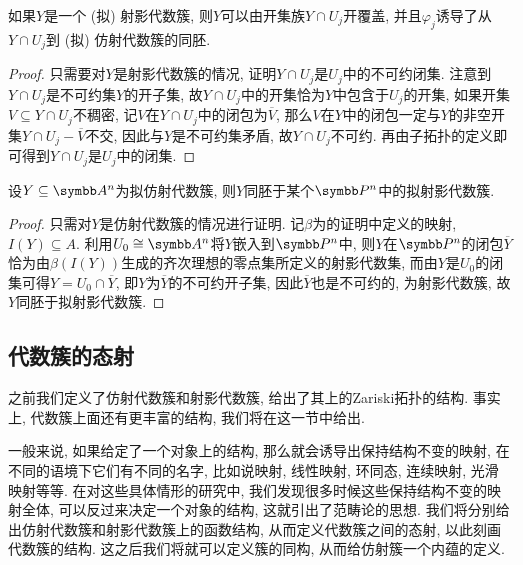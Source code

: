 \begin{proposition}\label{prop:projvarietyopencoverhomeo}
  如果$Y$是一个 (拟) 射影代数簇, 则$Y$可以由开集族$Y\cap U_j$开覆盖, 并且$\varphi_j$诱导了从$Y\cap U_j$到 (拟) 仿射代数簇的同胚.
\end{proposition}

\begin{proof}
  只需要对$Y$是射影代数簇的情况, 证明$Y\cap U_j$是$U_j$中的不可约闭集. 注意到$Y\cap U_j$是不可约集$Y$的开子集, 故$Y\cap U_j$中的开集恰为$Y$中包含于$U_j$的开集\parencite[89, Lemma 16.2]{munkres_topology_2000}, 如果开集$V\subseteq Y\cap U_j$不稠密, 记$V$在$Y\cap U_j$中的闭包为$\overline{V}$, 那么$V$在$Y$中的闭包一定与$Y$的非空开集$Y\cap U_j-\overline{V}$不交\parencite[95, Theorem 17.5]{munkres_topology_2000}, 因此与$Y$是不可约集矛盾, 故$Y\cap U_j$不可约. 再由子拓扑的定义即可得到$Y\cap U_j$是$U_j$中的闭集.
\end{proof}

\begin{proposition}
  设$Y\subseteq \AF^n$为拟仿射代数簇, 则$Y$同胚于某个$\PP^n$中的拟射影代数簇.
\end{proposition}

\begin{proof}
  只需对$Y$是仿射代数簇的情况进行证明. 记$\beta$为的证明中定义的映射, $I(Y)\subseteq A$. 利用$U_0\cong\AF^n$将$Y$嵌入到$\PP^n$中, 则$Y$在$\PP^n$的闭包$\overline{Y}$恰为由$\beta (I(Y))$生成的齐次理想的零点集所定义的射影代数集, 而由$Y$是$U_0$的闭集可得$Y=U_0\cap \overline{Y}$, 即$Y$为$\overline{Y}$的不可约开子集, 因此$\overline{Y}$也是不可约的, 为射影代数簇, 故$Y$同胚于拟射影代数簇.
\end{proof}

\subsection{代数簇的态射}

之前我们定义了仿射代数簇和射影代数簇, 给出了其上的Zariski拓扑的结构. 事实上, 代数簇上面还有更丰富的结构, 我们将在这一节中给出.

一般来说, 如果给定了一个对象上的结构, 那么就会诱导出保持结构不变的映射, 在不同的语境下它们有不同的名字, 比如说映射, 线性映射, 环同态, 连续映射, 光滑映射等等. 在对这些具体情形的研究中, 我们发现很多时候这些保持结构不变的映射全体, 可以反过来决定一个对象的结构, 这就引出了范畴论的思想. 我们将分别给出仿射代数簇和射影代数簇上的函数结构, 从而定义代数簇之间的态射, 以此刻画代数簇的结构. 这之后我们将就可以定义簇的同构, 从而给仿射簇一个内蕴的定义.

